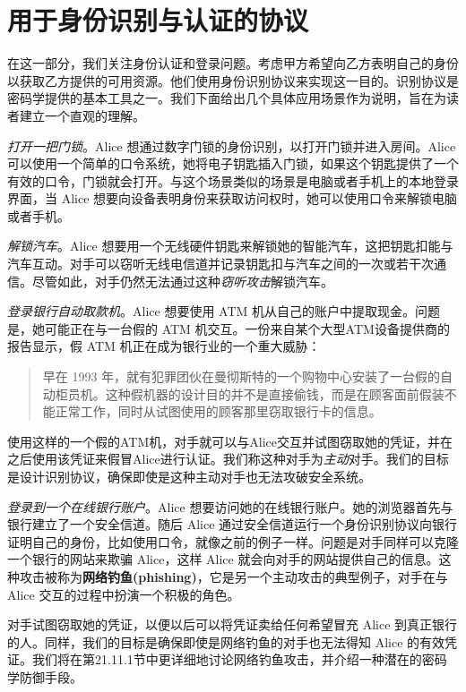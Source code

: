 \chapter{用于身份识别与认证的协议}

在这一部分，我们关注身份认证和登录问题。考虑甲方希望向乙方表明自己的身份以获取乙方提供的可用资源。他们使用身份识别协议来实现这一目的。识别协议是密码学提供的基本工具之一。我们下面给出几个具体应用场景作为说明，旨在为读者建立一个直观的理解。

\emph{打开一把门锁}。Alice 想通过数字门锁的身份识别，以打开门锁并进入房间。Alice 可以使用一个简单的口令系统，她将电子钥匙插入门锁，如果这个钥匙提供了一个有效的口令，门锁就会打开。与这个场景类似的场景是电脑或者手机上的本地登录界面，当 Alice 想要向设备表明身份来获取访问权时，她可以使用口令来解锁电脑或者手机。

\emph{解锁汽车}。Alice 想要用一个无线硬件钥匙来解锁她的智能汽车，这把钥匙扣能与汽车互动。对手可以窃听无线电信道并记录钥匙扣与汽车之间的一次或若干次通信。尽管如此，对手仍然无法通过这种\emph{窃听攻击}解锁汽车。

\emph{登录银行自动取款机}。Alice 想要使用 ATM 机从自己的账户中提取现金。问题是，她可能正在与一台假的 ATM 机交互。一份来自某个大型ATM设备提供商的报告显示，假 ATM 机正在成为银行业的一个重大威胁：
\begin{quote}
早在 1993 年，就有犯罪团伙在曼彻斯特的一个购物中心安装了一台假的自动柜员机。这种假机器的设计目的并不是直接偷钱，而是在顾客面前假装不能正常工作，同时从试图使用的顾客那里窃取银行卡的信息。
\end{quote}
使用这样的一个假的ATM机，对手就可以与Alice交互并试图窃取她的凭证，并在之后使用该凭证来假冒Alice进行认证。我们称这种对手为\emph{主动}对手。我们的目标是设计识别协议，确保即使是这种主动对手也无法攻破安全系统。

\emph{登录到一个在线银行账户}。Alice 想要访问她的在线银行账户。她的浏览器首先与银行建立了一个安全信道。随后 Alice 通过安全信道运行一个身份识别协议向银行证明自己的身份，比如使用口令，就像之前的例子一样。问题是对手同样可以克隆一个银行的网站来欺骗 Alice，这样 Alice 就会向对手的网站提供自己的信息。这种攻击被称为\textbf{网络钓鱼(phishing)}，它是另一个主动攻击的典型例子，对手在与 Alice 交互的过程中扮演一个积极的角色。


对手试图窃取她的凭证，以便以后可以将凭证卖给任何希望冒充 Alice 到真正银行的人。同样，我们的目标是确保即使是网络钓鱼的对手也无法得知 Alice 的有效凭证。我们将在第21.11.1节中更详细地讨论网络钓鱼攻击，并介绍一种潜在的密码学防御手段。

